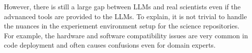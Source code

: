 However, there is still a large gap between LLMs and real scientists even if the advnanced tools are provided to the LLMs. To explain, it is not trivial to handle the nuances in the experiement environment setup for the science repositories. For example, the hardware and software compatibility issues are very common in code deployment and often causes confusions even for domain experts.


